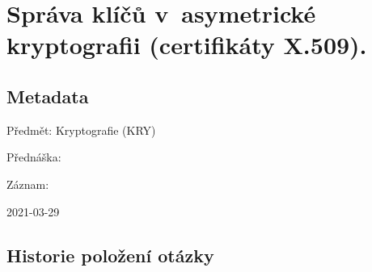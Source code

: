 

\chapter{Správa klíčů v~asymetrické kryptografii (certifikáty X.509).}


\section{Metadata}

\begin{compactitem}
    \item Předmět: Kryptografie (KRY)
    \item Přednáška:
    \begin{compactitem}
        \item {}
    \end{compactitem}
    \item Záznam:
    \begin{compactitem}
        \item 2021-03-29
    \end{compactitem}
\end{compactitem}


\section{Historie položení otázky}

